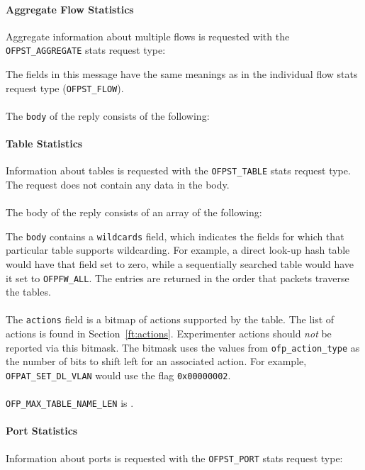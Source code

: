 \paragraph{Aggregate Flow Statistics}
Aggregate information about multiple flows is requested with the \verb|OFPST_AGGREGATE| stats request type:



The fields in this message have the same meanings as in the individual flow stats request type (\verb|OFPST_FLOW|).
\\\\
The \verb|body| of the reply consists of the following:

 

\paragraph{Table Statistics}
Information about tables is requested with the \verb|OFPST_TABLE| stats request type.  The request does not contain any data in the body.
\\\\
The body of the reply consists of an array of the following:


The \verb|body| contains a \verb|wildcards| field, which indicates the fields for which that particular table supports wildcarding. For example, a direct look-up hash table would have that field set to zero, while a sequentially searched table would have it set to \verb|OFPFW_ALL|. The entries are returned in the order that packets traverse the tables. 
\\\\
The \verb|actions| field is a bitmap of actions supported by the table.  The list of actions is found in Section~\ref{ft:actions}. Experimenter actions should \emph{not} be reported via this bitmask. The bitmask uses the values from \verb|ofp_action_type| as the number of bits to shift left for an associated action. For example, \verb|OFPAT_SET_DL_VLAN| would use the flag \verb|0x00000002|.
\\\\
\verb|OFP_MAX_TABLE_NAME_LEN| is .

\paragraph{Port Statistics}
Information about ports is requested with the \verb|OFPST_PORT| stats request type:

